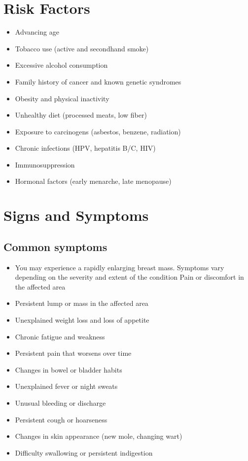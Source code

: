 \section{Risk Factors}

\begin{itemize}[noitemsep]
  \item Advancing age
  \item Tobacco use (active and secondhand smoke)
  \item Excessive alcohol consumption
  \item Family history of cancer and known genetic syndromes
  \item Obesity and physical inactivity
  \item Unhealthy diet (processed meats, low fiber)
  \item Exposure to carcinogens (asbestos, benzene, radiation)
  \item Chronic infections (HPV, hepatitis B/C, HIV)
  \item Immunosuppression
  \item Hormonal factors (early menarche, late menopause)
\end{itemize}
\section{Signs and Symptoms}

\subsection{Common symptoms}
\begin{itemize}[noitemsep]
  \item You may experience a rapidly enlarging breast mass. Symptoms vary depending on the severity and extent of the condition Pain or discomfort in the affected area
  \item Persistent lump or mass in the affected area
  \item Unexplained weight loss and loss of appetite
  \item Chronic fatigue and weakness
  \item Persistent pain that worsens over time
  \item Changes in bowel or bladder habits
  \item Unexplained fever or night sweats
  \item Unusual bleeding or discharge
  \item Persistent cough or hoarseness
  \item Changes in skin appearance (new mole, changing wart)
  \item Difficulty swallowing or persistent indigestion
\end{itemize}

